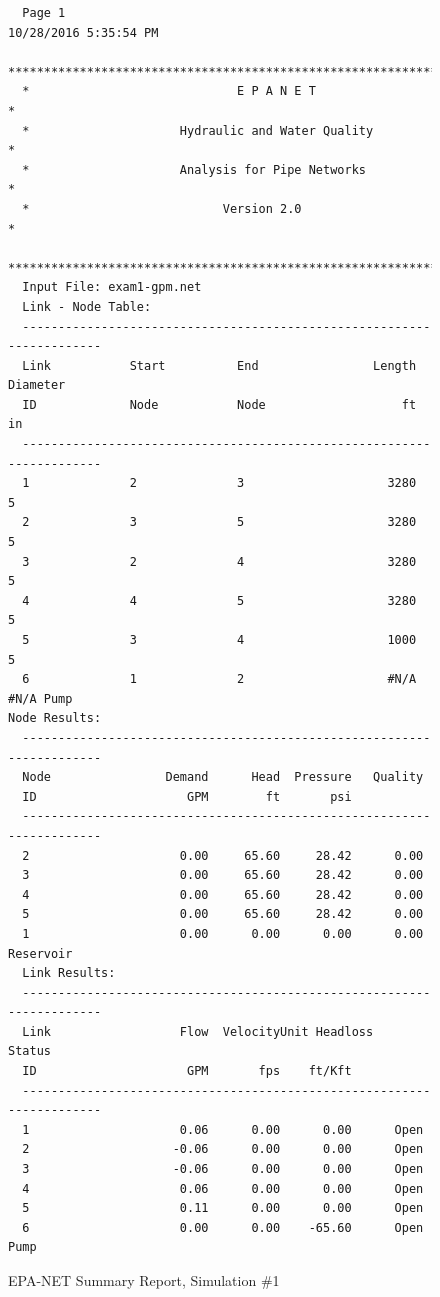 \documentclass[11pt]{article}
\begin{document}
\begin{enumerate}
\begin{figure}[ht!]
\begin{verbatim}
  Page 1                                           10/28/2016 5:35:54 PM
  **********************************************************************
  *                             E P A N E T                            *
  *                     Hydraulic and Water Quality                    *
  *                     Analysis for Pipe Networks                     *
  *                           Version 2.0                              *
  **********************************************************************
  Input File: exam1-gpm.net
  Link - Node Table:
  ----------------------------------------------------------------------
  Link           Start          End                Length  Diameter
  ID             Node           Node                   ft        in
  ----------------------------------------------------------------------
  1              2              3                    3280         5
  2              3              5                    3280         5
  3              2              4                    3280         5
  4              4              5                    3280         5
  5              3              4                    1000         5
  6              1              2                    #N/A      #N/A Pump
Node Results:
  ----------------------------------------------------------------------
  Node                Demand      Head  Pressure   Quality
  ID                     GPM        ft       psi          
  ----------------------------------------------------------------------
  2                     0.00     65.60     28.42      0.00
  3                     0.00     65.60     28.42      0.00
  4                     0.00     65.60     28.42      0.00
  5                     0.00     65.60     28.42      0.00
  1                     0.00      0.00      0.00      0.00 Reservoir                                                           
  Link Results:
  ----------------------------------------------------------------------
  Link                  Flow  VelocityUnit Headloss    Status
  ID                     GPM       fps    ft/Kft
  ----------------------------------------------------------------------
  1                     0.06      0.00      0.00      Open
  2                    -0.06      0.00      0.00      Open
  3                    -0.06      0.00      0.00      Open
  4                     0.06      0.00      0.00      Open
  5                     0.11      0.00      0.00      Open
  6                     0.00      0.00    -65.60      Open Pump
  \end{verbatim}
     \caption{EPA-NET Summary Report, Simulation \#1}
   \label{fig:epanet1} 
\end{figure}



\end{enumerate}
\end{document}
